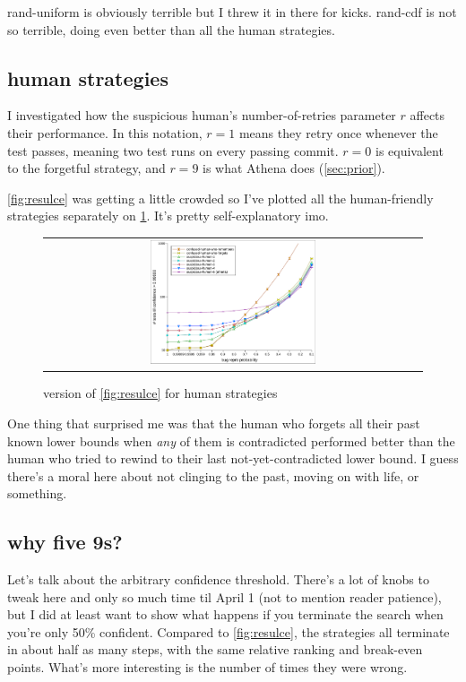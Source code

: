 \documentclass[11pt]{sigplanconf}
\begin{document}
{\sf rand-uniform} is obviously terrible but I threw it in there for kicks.
{\sf rand-cdf} is not so terrible, doing even better than all the human strategies.

\subsection{human strategies}

I investigated how the suspicious human's number-of-retries parameter $r$ affects their performance.
In this notation, $r=1$ means they retry once whenever the test passes, meaning two test runs on every passing commit.
$r=0$ is equivalent to the forgetful strategy, and $r=9$ is what Athena does (\cref{sec:prior}).%

\cref{fig:resulce} was getting a little crowded so I've plotted all the human-friendly strategies separately on \cref{fig:human}.
It's pretty self-explanatory imo.

\begin{figure}[t]
	\begin{tabular}{c}
		\includegraphics[width=0.45\textwidth]{resulce-human.pdf}
	\end{tabular}
	\caption{version of \cref{fig:resulce} for human strategies}
	\label{fig:human}
\end{figure}

One thing that surprised me was that the human who forgets all their past known lower bounds when {\it any} of them is contradicted
performed better than the human who tried
to rewind to their last not-yet-contradicted lower bound.
I guess there's a moral here about not clinging to the past, moving on with life, or something.

\subsection{why five 9s?}

Let's talk about the arbitrary confidence threshold.
There's a lot of knobs to tweak here and only so much time til April 1 (not to mention reader patience),
but I did at least want to show what happens if you terminate the search when you're only 50\% confident.
Compared to \cref{fig:resulce},
the strategies all terminate in about half as many steps, with the same relative ranking and break-even points.
What's more interesting is the number of times they were wrong.
\end{document}
